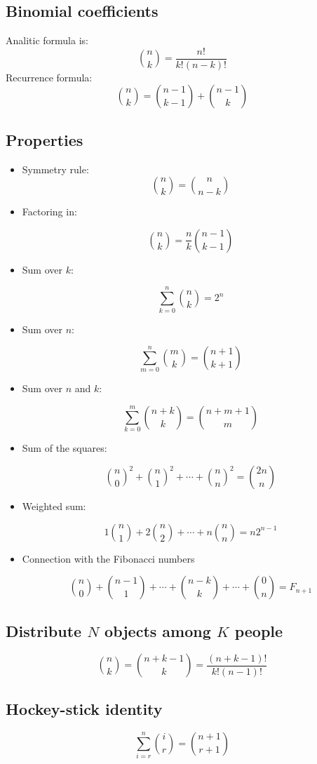 \subsection{Binomial coefficients}
Analitic formula is:
$$\binom{n}{k} = \frac{n!}{k!(n-k)!}$$
Recurrence formula:
$$\binom{n}{k} = \binom{n-1}{k-1} + \binom{n-1}{k}$$

\subsection{Properties}
\begin{itemize}
\item Symmetry rule:
    $$ \binom n k = \binom n {n-k}$$

\item Factoring in:

    $$ \binom n k = \frac n k \binom {n-1} {k-1} $$

\item Sum over $k$:

    $$ \sum_{k = 0}^n \binom n k = 2 ^ n $$

\item Sum over $n$:

    $$ \sum_{m = 0}^n \binom m k = \binom {n + 1} {k + 1} $$

\item Sum over $n$ and $k$:

    $$ \sum_{k = 0}^m  \binom {n + k} k = \binom {n + m + 1} m $$

\item Sum of the squares:

    $$ {\binom n 0}^2 + {\binom n 1}^2 + \cdots + {\binom n n}^2 = \binom {2n} n $$

\item Weighted sum:

    $$ 1 \binom n 1 + 2 \binom n 2 + \cdots + n \binom n n = n 2^{n-1} $$

\item Connection with the Fibonacci numbers

    $$ \binom n 0 + \binom {n-1} 1 + \cdots + \binom {n-k} k + \cdots + \binom 0 n = F_{n+1} $$

\end{itemize}
\subsection{Distribute $N$ objects among $K$ people}
$$\binom{n}{k} = \binom{n + k -1}{k} = \frac{(n + k - 1)!}{k!(n-1)!}$$
\subsection{Hockey-stick identity}
$$\sum_{i=r}^{n}\binom{i}{r} = \binom{n+1}{r+1}$$